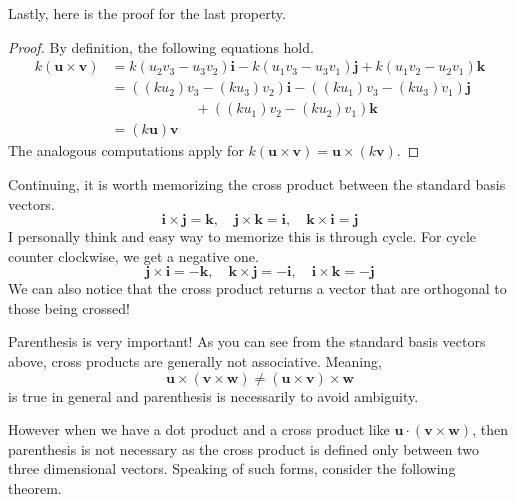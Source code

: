 \documentclass[../../../main.tex]{subfiles}
\begin{document}
Lastly, here is the proof for the last property.

\begin{proof}
By definition, the following equations hold.
\begin{align*}
    k (\mathbf{u} \times \mathbf{v})
    &= k(u_2v_3 - u_3v_2) \mathbf{i} - k(u_1v_3 - u_3v_1) \mathbf{j}
        + k(u_1v_2 - u_2v_1) \mathbf{k} \\
    &= ((ku_2)v_3 - (ku_3)v_2) \mathbf{i}
        - ((ku_1)v_3 - (ku_3)v_1) \mathbf{j} \\
        &\qquad\qquad\qquad + ((ku_1)v_2 - (ku_2)v_1) \mathbf{k} \\
    &= (k\mathbf{u}) \mathbf{v}
\end{align*}
The analogous computations apply for $k (\mathbf{u} \times \mathbf{v})
= \mathbf{u} \times (k\mathbf{v})$.
\end{proof}

Continuing, it is worth memorizing the cross product between the
standard basis vectors.
\[
\mathbf{i} \times \mathbf{j} = \mathbf{k}, \quad
\mathbf{j} \times \mathbf{k} = \mathbf{i}, \quad
\mathbf{k} \times \mathbf{i} = \mathbf{j}
\]
I personally think and easy way to memorize this is through cycle.
For cycle counter clockwise, we get a negative one.
\[
\mathbf{j} \times \mathbf{i} = -\mathbf{k}, \quad
\mathbf{k} \times \mathbf{j} = -\mathbf{i}, \quad
\mathbf{i} \times \mathbf{k} = -\mathbf{j}
\]
We can also notice that the cross product returns a vector
that are orthogonal to those being crossed!

\begin{important}
Parenthesis is very important! As you can see from the standard
basis vectors above, cross products are generally not associative.
Meaning,
\[
\mathbf{u} \times (\mathbf{v} \times \mathbf{w})
\neq (\mathbf{u} \times \mathbf{v}) \times \mathbf{w}
\]
is true in general and parenthesis is necessarily to avoid ambiguity.
\end{important}

However when we have a dot product and a cross product like
$\mathbf{u} \cdot (\mathbf{v} \times \mathbf{w})$, then parenthesis
is not necessary as the cross product is defined only between two
three dimensional vectors. Speaking of such forms, consider the
following theorem.
\end{document}
